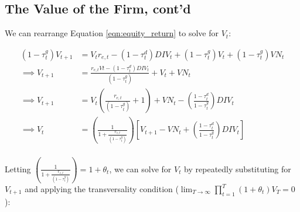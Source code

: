 \subsection{The Value of the Firm, cont'd}
We can rearrange Equation \ref{eqn:equity_return} to solve for $V_{t}$:

\begin{equation}
\begin{split}
(1-\tau^{g}_{t})V_{t+1} &=V_{t}r_{e,t}-(1-\tau^{d}_{t})DIV_{t}+(1-\tau^{g}_{t})V_{t}+(1-\tau^{g}_{t})VN_{t}\\
\implies  V_{t+1} & = \frac{r_{e,t}V{t}-(1-\tau^{d}_{t})DIV_{t}}{(1-\tau^{g}_{t})}+V_{t}+VN_{t} \\
\implies  V_{t+1} & = V_{t}\left(\frac{r_{e,t}}{(1-\tau^{g}_{t})}+1\right)+VN_{t} - \left(\frac{1-\tau^{d}_{t}}{1-\tau^{g}_{t}}\right)DIV_{t} \\
\implies V_{t} &= \left(\frac{1}{1+\frac{r_{e,t}}{(1-\tau^{g}_{t})}}\right)\left[V_{t+1} - VN_{t} + \left(\frac{1-\tau^{d}_{t}}{1-\tau^{g}_{t}}\right)DIV_{t}\right]  \\
\end{split}
\end{equation}

\noindent\noindent Letting $ \left(\frac{1}{1+\frac{r_{e,t}}{(1-\tau^{g}_{t})}}\right) = 1+\theta_{t}$, we can solve for $V_{t}$ by repeatedly substituting for $V_{t+1}$ and applying the transversality condition ($\lim_{T \to \infty} \prod_{t=1}^{T}(1+\theta_{t})V_{T}=0$):

